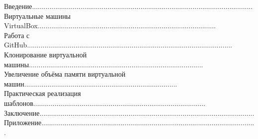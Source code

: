 Введение..................................................................................................................
\\Виртуальные машины VirtualBox............................................................................................
\\Работа с GitHub..........................................................................................................
\\Клонирование виртуальной машины..........................................................................................
\\Увеличение объёма памяти виртуальной машин...............................................................................
\\Практическая реализация шаблонов.........................................................................................
\\Заключение...............................................................................................................
\\Приложение...............................................................................................................